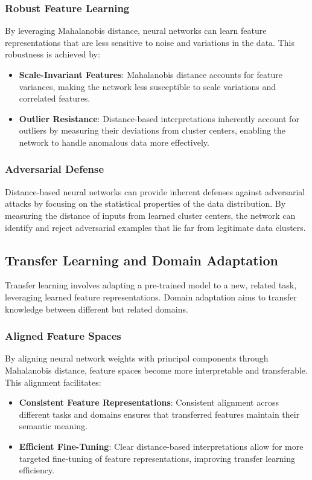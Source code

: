 \subsubsection{Robust Feature Learning}
By leveraging Mahalanobis distance, neural networks can learn feature representations that are less sensitive to noise and variations in the data. This robustness is achieved by:
\begin{itemize}
    \item \textbf{Scale-Invariant Features}: Mahalanobis distance accounts for feature variances, making the network less susceptible to scale variations and correlated features.
    \item \textbf{Outlier Resistance}: Distance-based interpretations inherently account for outliers by measuring their deviations from cluster centers, enabling the network to handle anomalous data more effectively.
\end{itemize}

\subsubsection{Adversarial Defense}
Distance-based neural networks can provide inherent defenses against adversarial attacks by focusing on the statistical properties of the data distribution. By measuring the distance of inputs from learned cluster centers, the network can identify and reject adversarial examples that lie far from legitimate data clusters.

\subsection{Transfer Learning and Domain Adaptation}
\label{subsec:transfer_learning}

Transfer learning involves adapting a pre-trained model to a new, related task, leveraging learned feature representations. Domain adaptation aims to transfer knowledge between different but related domains.

\subsubsection{Aligned Feature Spaces}
By aligning neural network weights with principal components through Mahalanobis distance, feature spaces become more interpretable and transferable. This alignment facilitates:
\begin{itemize}
    \item \textbf{Consistent Feature Representations}: Consistent alignment across different tasks and domains ensures that transferred features maintain their semantic meaning.
    \item \textbf{Efficient Fine-Tuning}: Clear distance-based interpretations allow for more targeted fine-tuning of feature representations, improving transfer learning efficiency.
\end{itemize}

